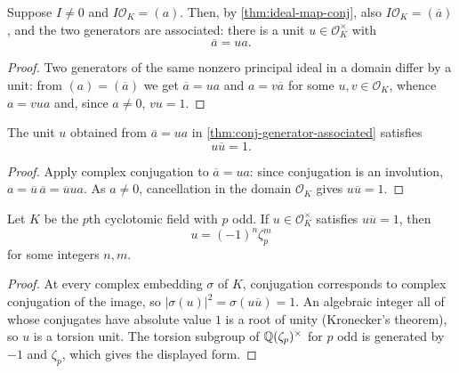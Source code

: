\begin{theorem}\label{thm:conj-generator-associated}
  \leanok
Suppose $I \ne 0$ and $I\mathcal O_K=(a)$.  Then, by
\cref{thm:ideal-map-conj}, also $I\mathcal O_K=(\overline a)$, and the two
generators are associated: there is a unit $u\in\mathcal O_K^\times$ with
\[
  \overline a = u a.
\]
\end{theorem}
\begin{proof}\leanok
Two generators of the same nonzero principal ideal in a domain differ by a
unit: from $(a) = (\overline a)$ we get $\overline a = ua$ and $a = v
\overline a$ for some $u, v \in \mathcal O_K$, whence $a = vua$ and, since
$a \ne 0$, $vu = 1$.
\end{proof}

\begin{theorem}\label{thm:conj-unit-mul-one}
  \leanok
The unit $u$ obtained from $\overline a=ua$ in
\cref{thm:conj-generator-associated} satisfies
\[
  u\overline u=1.
\]
\end{theorem}
\begin{proof}\leanok
Apply complex conjugation to $\overline a=ua$: since conjugation is an
involution, $a = \overline u\,\overline a = \overline u u a$.  As $a\ne0$,
cancellation in the domain $\mathcal O_K$ gives $u\overline u=1$.
\end{proof}

\begin{theorem}\label{thm:antisymmetric-unit-classification}
  \leanok
Let $K$ be the $p$th cyclotomic field with $p$ odd.  If
$u\in\mathcal O_K^\times$ satisfies $u\overline u=1$, then
\[
  u=(-1)^n\zeta_p^m
\]
for some integers $n,m$.
\end{theorem}
\begin{proof}\leanok
At every complex embedding $\sigma$ of $K$, conjugation corresponds to
complex conjugation of the image, so $|\sigma(u)|^2 = \sigma(u
\overline u) = 1$.  An algebraic integer all of whose conjugates have
absolute value $1$ is a root of unity (Kronecker's theorem), so $u$ is a
torsion unit.  The torsion subgroup of $\mathbb{Q}(\zeta_p)^\times$ for $p$ odd is
generated by $-1$ and $\zeta_p$, which gives the displayed form.
\end{proof}

